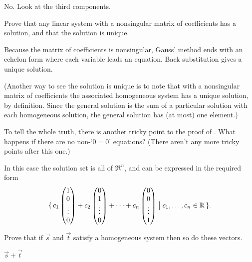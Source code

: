 \begin{exercises}
\begin{answer}
\begin{exparts}
\begin{equation*}
            \end{equation*}
          \partsitem No.
            Look at the third components.
        \end{exparts} 
      \end{answer}
  \item 
     Prove that any linear system with a nonsingular matrix of 
     coefficients has a solution, and that the solution is unique.
    \begin{answer}
        Because the matrix of coefficients is nonsingular, Gauss' method
        ends with an echelon form where each variable leads an equation.
        Back substitution gives a unique solution.

      (Another way to see the solution is unique is to note that
      with a nonsingular matrix of coefficients the associated
      homogeneous system has a unique solution, by definition.
      Since the general solution is the sum of a particular solution with
      each homogeneous solution, the general solution has 
      (at most) one element.)
     \end{answer}
  \item 
    To tell the whole truth, there is another tricky point to the
    proof of
    .
    What happens if there are no non-`\( 0=0 \)' equations?
    (There aren't any more tricky points after this one.)
    \begin{answer}
      In this case the solution set is all of \( \Re^n \), and can be
      expressed in the required form
      \begin{equation*}
        \mbox{$\{\,c_1\begin{pmatrix} 1 \\ 0 \\ \vdots \\ 0 \end{pmatrix}
             +c_2\begin{pmatrix} 0 \\ 1 \\ \vdots \\ 0 \end{pmatrix}
             +\cdots
             +c_n\begin{pmatrix} 0 \\ 0 \\ \vdots \\ 1 \end{pmatrix}
             \bigm| c_1,\ldots,c_n\in\mathbb{R}\,\}$}.
      \end{equation*}  
     \end{answer}
  \recommended \item 
    Prove that if \( \vec{s} \) and \( \vec{t} \)
    satisfy a homogeneous system then so do these vectors.
    \begin{exparts*}
      \partsitem \( \vec{s}+\vec{t} \)

\end{exparts*}
\end{exercises}
